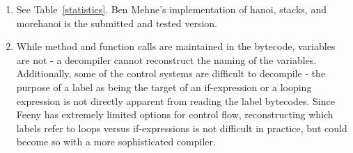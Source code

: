 \documentclass[notitlepage]{report}
\begin{document}
\begin{enumerate}
	\item
			See Table~\ref{statistics}.  Ben Mehne's implementation of hanoi, stacks, and morehanoi is the submitted and tested version.
	\item
		While method and function calls are maintained in the bytecode, variables are not - a decompiler cannot reconstruct the naming of the variables.    Additionally, some of the control systems are difficult to decompile - the purpose of a label as being the target of an if-expression or a looping expression is not directly apparent from reading the label bytecodes.  Since Feeny has extremely limited options for control flow, reconstructing which labels refer to loops versus if-expressions is not difficult in practice, but could become so with a more sophisticated compiler.


\end{enumerate}
\end{document}
